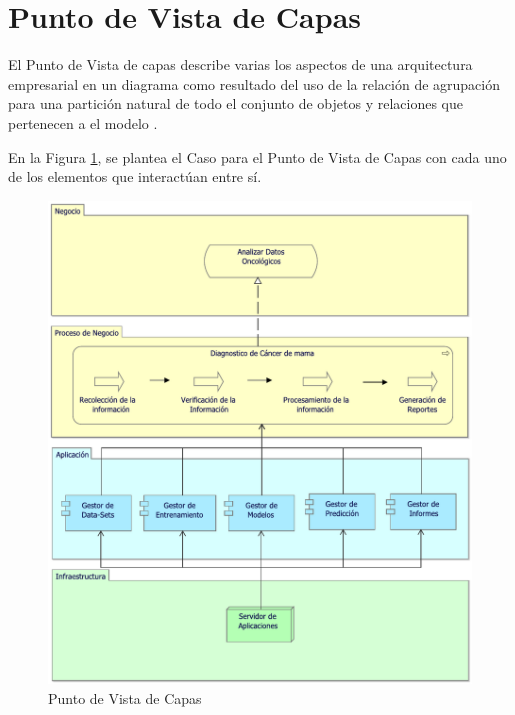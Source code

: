 \newpage
\section{Punto de Vista de Capas}
El Punto de Vista de capas describe varias los aspectos de una arquitectura empresarial en un diagrama como resultado del uso de la relación de agrupación para  una partición natural de todo el conjunto de objetos y relaciones que pertenecen a el modelo \cite{BolanosCastro2019}.

En la Figura \ref{PvCapas}, se plantea el Caso para el Punto de Vista de Capas con cada uno de los elementos que interactúan entre sí. 

\begin{figure}[h!]
	\centering
	\includegraphics[width=0.8\linewidth]{ARQUITECTURA/imgs/CapaTecnologia/6_PvCapasTec}
	\caption{Punto de Vista de Capas}
	\label{PvCapas}
\end{figure}

